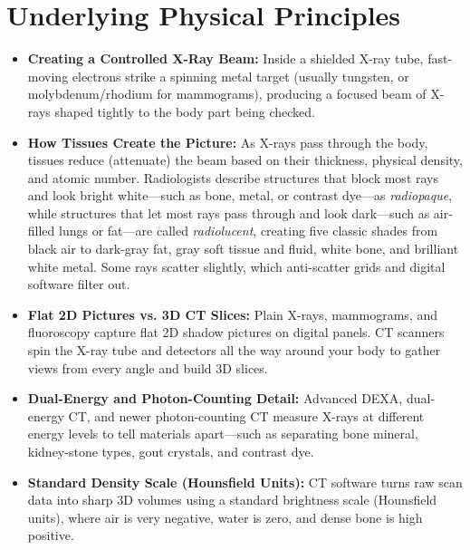 \section{Underlying Physical Principles}
\begin{itemize}
  \item \textbf{Creating a Controlled X-Ray Beam:} Inside a shielded X-ray tube, fast-moving electrons strike a spinning metal target (usually tungsten, or molybdenum/rhodium for mammograms), producing a focused beam of X-rays shaped tightly to the body part being checked.
  \item \textbf{How Tissues Create the Picture:} As X-rays pass through the body, tissues reduce (attenuate) the beam based on their thickness, physical density, and atomic number. Radiologists describe structures that block most rays and look bright white---such as bone, metal, or contrast dye---as \emph{radiopaque}, while structures that let most rays pass through and look dark---such as air-filled lungs or fat---are called \emph{radiolucent}, creating five classic shades from black air to dark-gray fat, gray soft tissue and fluid, white bone, and brilliant white metal. Some rays scatter slightly, which anti-scatter grids and digital software filter out.
  \item \textbf{Flat 2D Pictures vs. 3D CT Slices:} Plain X-rays, mammograms, and fluoroscopy capture flat 2D shadow pictures on digital panels. CT scanners spin the X-ray tube and detectors all the way around your body to gather views from every angle and build 3D slices.
  \item \textbf{Dual-Energy and Photon-Counting Detail:} Advanced DEXA, dual-energy CT, and newer photon-counting CT measure X-rays at different energy levels to tell materials apart---such as separating bone mineral, kidney-stone types, gout crystals, and contrast dye.
  \item \textbf{Standard Density Scale (Hounsfield Units):} CT software turns raw scan data into sharp 3D volumes using a standard brightness scale (Hounsfield units), where air is very negative, water is zero, and dense bone is high positive.
\end{itemize}

